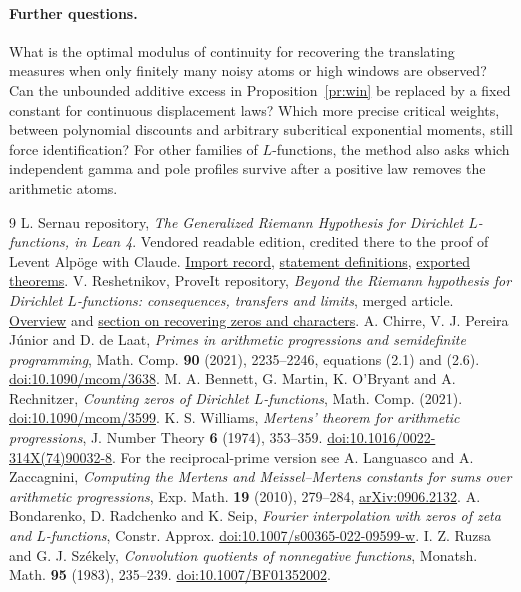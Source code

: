 \documentclass[11pt]{article}
\newcommand{\srcbase}{https://github.com/VladimirReshetnikov/ProveIt/blob/2a9f8e3ee74a1824d57546f0b1b4f1cef5df93d6/Analysis/GeneralizedRiemannHypothesis}
\begin{document}
\paragraph{Further questions.}
What is the optimal modulus of continuity for recovering the translating measures when only finitely many noisy atoms or high windows are observed? Can the unbounded additive excess in Proposition~\ref{pr:win} be replaced by a fixed constant for continuous displacement laws? Which more precise critical weights, between polynomial discounts and arbitrary subcritical exponential moments, still force identification? For other families of \(L\)-functions, the method also asks which independent gamma and pole profiles survive after a positive law removes the arithmetic atoms.

\begingroup\small\setlength{\parskip}{0pt}\begin{thebibliography}{9}\setlength{\itemsep}{2pt}\setlength{\parsep}{0pt}
 L. Sernau repository, \emph{The Generalized Riemann Hypothesis for Dirichlet \(L\)-functions, in Lean 4}. Vendored readable edition, credited there to the proof of Levent Alp\"oge with Claude. \href{\srcbase/vendor/grh-lean/README.md}{Import record},
\href{\srcbase/vendor/grh-lean/grh/src/Statements.lean}{statement definitions},
\href{\srcbase/vendor/grh-lean/grh/src/Main.lean}{exported theorems}.
 V. Reshetnikov, ProveIt repository, \emph{Beyond the Riemann hypothesis for Dirichlet \(L\)-functions: consequences, transfers and limits}, merged article. \href{\srcbase/Article/README.md}{Overview} and \href{\srcbase/Article/sections/rec.tex}{section on recovering zeros and characters}.
 A. Chirre, V. J. Pereira J\'unior and D. de Laat, \emph{Primes in arithmetic progressions and semidefinite programming}, Math. Comp. \textbf{90} (2021), 2235--2246, equations (2.1) and (2.6). \href{https://doi.org/10.1090/mcom/3638}{doi:10.1090/mcom/3638}.
 M. A. Bennett, G. Martin, K. O'Bryant and A. Rechnitzer, \emph{Counting zeros of Dirichlet \(L\)-functions}, Math. Comp. (2021). \href{https://doi.org/10.1090/mcom/3599}{doi:10.1090/mcom/3599}.
 K. S. Williams, \emph{Mertens' theorem for arithmetic progressions}, J. Number Theory \textbf{6} (1974), 353--359.
\href{https://doi.org/10.1016/0022-314X(74)90032-8}{doi:10.1016/0022-314X(74)90032-8}. For the reciprocal-prime version see A. Languasco and A. Zaccagnini, \emph{Computing the Mertens and Meissel--Mertens constants for sums over arithmetic progressions}, Exp. Math. \textbf{19} (2010), 279--284, \href{https://arxiv.org/abs/0906.2132}{arXiv:0906.2132}.
 A. Bondarenko, D. Radchenko and K. Seip, \emph{Fourier interpolation with zeros of zeta and \(L\)-functions}, Constr. Approx. \href{https://doi.org/10.1007/s00365-022-09599-w}{doi:10.1007/s00365-022-09599-w}.
 I. Z. Ruzsa and G. J. Sz\'ekely, \emph{Convolution quotients of nonnegative functions}, Monatsh. Math. \textbf{95} (1983), 235--239. \href{https://doi.org/10.1007/BF01352002}{doi:10.1007/BF01352002}.
\end{thebibliography}\endgroup
\end{document}

